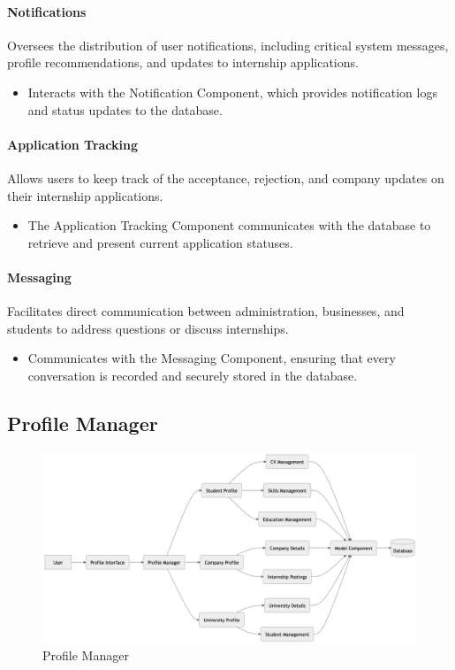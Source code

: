 \paragraph{Notifications}
Oversees the distribution of user notifications, including critical system messages, profile recommendations, and updates to internship applications.
\begin{itemize}
    \item Interacts with the Notification Component, which provides notification logs and status updates to the database.
\end{itemize}

\paragraph{Application Tracking}
Allows users to keep track of the acceptance, rejection, and company updates on their internship applications.
\begin{itemize}
    \item The Application Tracking Component communicates with the database to retrieve and present current application statuses.
\end{itemize}

\paragraph{Messaging}
Facilitates direct communication between administration, businesses, and students to address questions or discuss internships.
\begin{itemize}
    \item Communicates with the Messaging Component, ensuring that every conversation is recorded and securely stored in the database.
\end{itemize}

\subsection{Profile Manager}
\label{subsubsec:profile_manager}

\begin{figure}[H]
    \begin{center}
        \includegraphics[width=0.82\linewidth]{JhaBhatiaSharma/imagesDD/ProfileManager.png}
        \caption{Profile Manager}
        \label{fig:profilemanager}%
    \end{center}
\end{figure}


